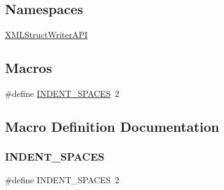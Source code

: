 \subsection*{Namespaces}
\begin{DoxyCompactItemize}
\item 
 \mbox{\hyperlink{namespaceXMLStructWriterAPI}{X\+M\+L\+Struct\+Writer\+A\+PI}}
\end{DoxyCompactItemize}
\subsection*{Macros}
\begin{DoxyCompactItemize}
\item 
\#define \mbox{\hyperlink{adat-devel_2other__libs_2xpath__reader_2include_2xml__array__writer_8h_ad3b6821be9e4586b39163dad279459c4}{I\+N\+D\+E\+N\+T\+\_\+\+S\+P\+A\+C\+ES}}~2
\end{DoxyCompactItemize}


\subsection{Macro Definition Documentation}
\mbox{\label{adat-devel_2other__libs_2xpath__reader_2include_2xml__array__writer_8h_ad3b6821be9e4586b39163dad279459c4}} 
\subsubsection{\texorpdfstring{INDENT\_SPACES}{INDENT\_SPACES}}
{\footnotesize\ttfamily \#define I\+N\+D\+E\+N\+T\+\_\+\+S\+P\+A\+C\+ES~2}

